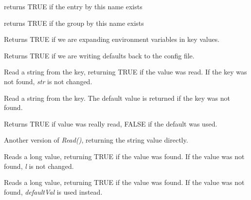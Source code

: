 returns TRUE if the entry by this name exists

\label{wxconfigbasehasgroup}


returns TRUE if the group by this name exists

\label{wxconfigbaseisexpandingenvvars}


Returns TRUE if we are expanding environment variables in key values.

\label{wxconfigbaseisrecordingdefaults}


Returns TRUE if we are writing defaults back to the config file.

\label{wxconfigbaseread}


Read a string from the key, returning TRUE if the value was read. If the key
was not found, {\it str} is not changed.


Read a string from the key. The default value is returned if the key was not
found.

Returns TRUE if value was really read, FALSE if the default was used.


Another version of {\it Read()}, returning the string value directly.


Reads a long value, returning TRUE if the value was found. If the value was
not found, {\it l} is not changed.


Reads a long value, returning TRUE if the value was found. If the value was
not found, {\it defaultVal} is used instead.

